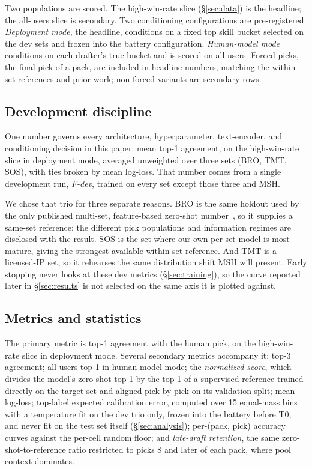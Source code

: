 Two populations are scored. The high-win-rate slice (\S\ref{sec:data}) is
the headline; the all-users slice is secondary. Two conditioning
configurations are pre-registered. \emph{Deployment mode}, the headline,
conditions on a fixed top skill bucket selected on the dev sets and frozen
into the battery configuration. \emph{Human-model mode} conditions on each
drafter's true bucket and is scored on all users. Forced picks, the final
pick of a pack, are included in headline numbers, matching the within-set
references and prior work; non-forced variants are secondary rows.

\subsection{Development discipline}

One number governs every architecture, hyperparameter, text-encoder, and
conditioning decision in this paper: mean top-1 agreement, on the
high-win-rate slice in deployment mode, averaged unweighted over three
sets (BRO, TMT, SOS), with ties broken by mean log-loss. That number comes
from a single development run, \emph{F-dev}, trained on every set except
those three and MSH.

We chose that trio for three separate reasons. BRO is the same holdout used
by the only published multi-set, feature-based zero-shot
number~\citep{bertram2024cards}, so it supplies a same-set reference; the
different pick populations and information regimes are disclosed with the
result. SOS is the set where our own per-set model is most mature, giving
the strongest available within-set reference. And TMT is a
licensed-IP set, so it rehearses the same distribution shift MSH will
present. Early stopping never looks at these dev metrics
(\S\ref{sec:training}), so the curve reported later in \S\ref{sec:results}
is not selected on the same axis it is plotted against.

\subsection{Metrics and statistics}

The primary metric is top-1 agreement with the human pick, on the
high-win-rate slice in deployment mode. Several secondary metrics
accompany it: top-3 agreement; all-users top-1 in human-model mode; the
\emph{normalized score}, which divides the model's zero-shot top-1 by the
top-1 of a supervised reference trained directly on the target set and
aligned pick-by-pick on its validation split; mean log-loss; top-label
expected calibration error,
computed over 15 equal-mass bins with a temperature fit on the dev trio
only, frozen into the battery before T0, and never fit on the test set
itself (\S\ref{sec:analysis}); per-(pack, pick) accuracy curves against
the per-cell random floor; and \emph{late-draft retention}, the same
zero-shot-to-reference ratio restricted to picks 8 and later of each pack,
where pool context dominates.

